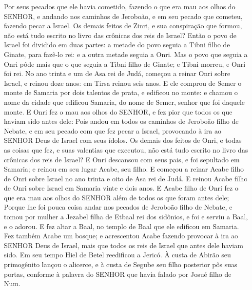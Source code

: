 {  Por seus pecados que ele havia cometido, fazendo o que era mau aos olhos do SENHOR, e andando nos caminhos de Jeroboão, e em seu pecado que cometeu, fazendo pecar a Israel.
  Os demais feitos de Zinri, e sua conspiração que formou, não está tudo escrito no livro das crônicas dos reis de Israel?
  Então o povo de Israel foi dividido em duas partes: a metade do povo seguia a Tibni filho de Ginate, para fazê-lo rei: e a outra metade seguia a Onri.
  Mas o povo que seguia a Onri pôde mais que o que seguia a Tibni filho de Ginate; e Tibni morreu, e Onri foi rei.
  No ano trinta e um de Asa rei de Judá, começou a reinar Onri sobre Israel, e reinou doze anos: em Tirsa reinou seis anos.
  E ele comprou de Semer o monte de Samaria por dois talentos de prata, e edificou no monte: e chamou o nome da cidade que edificou Samaria, do nome de Semer, senhor que foi daquele monte.
  E Onri fez o mau aos olhos do SENHOR, e fez pior que todos os que haviam sido antes dele:
  Pois andou em todos os caminhos de Jeroboão filho de Nebate, e em seu pecado com que fez pecar a Israel, provocando à ira ao SENHOR Deus de Israel com seus ídolos.
  Os demais dos feitos de Onri, e todas as coisas que fez, e suas valentias que executou, não está tudo escrito no livro das crônicas dos reis de Israel?
  E Onri descansou com seus pais, e foi sepultado em Samaria; e reinou em seu lugar Acabe, seu filho. %
  E começou a reinar Acabe filho de Onri sobre Israel no ano trinta e oito de Asa rei de Judá. %
  E reinou Acabe filho de Onri sobre Israel em Samaria vinte e dois anos. E Acabe filho de Onri fez o que era mau aos olhos do SENHOR além de todos os que foram antes dele;
  Porque lhe foi pouca coisa andar nos pecados de Jeroboão filho de Nebate, e tomou por mulher a Jezabel filha de Etbaal rei dos sidônios, e foi e serviu a Baal, e o adorou.
  E fez altar a Baal, no templo de Baal que ele edificou em Samaria.
  Fez também Acabe um bosque; e acrescentou Acabe fazendo provocar à ira ao SENHOR Deus de Israel, mais que todos os reis de Israel que antes dele haviam sido.
  Em seu tempo Hiel de Betel reedificou a Jericó. À custa de Abirão seu primogênito lançou o alicerce, e à custa de Segube seu filho posterior pôs suas portas, conforme à palavra do SENHOR que havia falado por Josué filho de Num.
\par }

